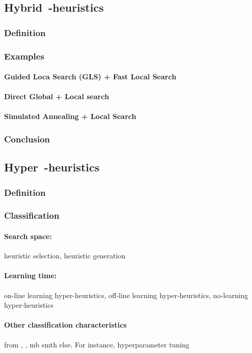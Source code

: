 \subsection{Hybrid~-heuristics}
\subsubsection{Definition}
\subsubsection{Examples}
\paragraph{Guided Loca Search (GLS) + Fast Local Search} \cite{tsang1997fast}
\paragraph{Direct Global + Local search} \cite{syrjakow1999efficient}
\paragraph{Simulated Annealing + Local Search} \cite{martin1996combining}
\subsubsection{Conclusion}

\subsection{Hyper~-heuristics}
\subsubsection{Definition}
\subsubsection{Classification}
\paragraph{Search space:} heuristic selection, heuristic generation
\paragraph{Learning time:} on-line learning hyper-heuristics, off-line learning hyper-heuristics, no-learning hyper-heuristics
\paragraph{Other classification characteristics} from \cite{surv:kerschke2019automated}, \cite{burke2019classification}, mb smth else. For instance, hyperparameter tuning
